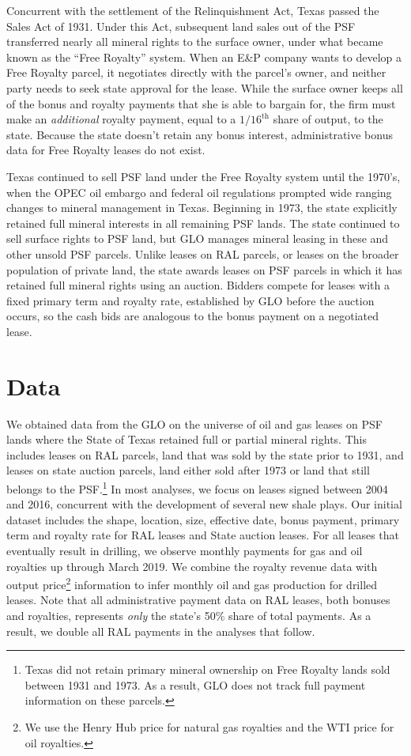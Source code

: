 \documentclass[12pt]{article}
\newcommand{\inputy}[1]{\unskip}
\begin{document}
Concurrent with the settlement of the Relinquishment Act, Texas passed the Sales Act of 1931. Under this Act, subsequent land sales out of the PSF transferred nearly all mineral rights to the surface owner, under what became known as the ``Free Royalty'' system.  When an E\&P company wants to develop a Free Royalty parcel, it negotiates directly with the parcel's owner, and neither party needs to seek state approval for the lease.  While the surface owner keeps all of the bonus and royalty payments that she is able to bargain for, the firm must make an \textit{additional} royalty payment, equal to a $1/16^{\text{th}}$ share of output, to the state.  Because the state doesn't retain any bonus interest, administrative bonus data for Free Royalty leases do not exist. 

Texas continued to sell PSF land under the Free Royalty system until the 1970's, when the OPEC oil embargo and federal oil regulations prompted wide ranging changes to mineral management in Texas. Beginning in 1973, the state explicitly retained full mineral interests in all remaining PSF lands.  The state continued to sell surface rights to PSF land, but GLO manages mineral leasing in these and other unsold PSF parcels. Unlike leases on RAL parcels, or leases on the broader population of private land, the state awards leases on PSF parcels in which it has retained full mineral rights using an auction. Bidders compete for leases with a fixed primary term and royalty rate, established by GLO before the auction occurs, so the cash bids are analogous to the bonus payment on a negotiated lease. 

\section{Data \label{sec:Data}}
We obtained data from the GLO on the universe of oil and gas leases on PSF lands where the State of Texas retained full or partial mineral rights. This includes leases on RAL parcels, land that was sold by the state prior to 1931, and leases on state auction parcels, land either sold after 1973 or land that still belongs to the PSF.\footnote{Texas did not retain primary mineral ownership on Free Royalty lands sold between 1931 and 1973. As a result, GLO does not track full payment information on these parcels.} In most analyses, we focus on leases signed between 2004 and 2016, concurrent with the development of several new shale plays.  Our initial dataset includes the shape, location, size, effective date, bonus payment, primary term and royalty rate for \inputy{../output/estimates/Nsample_RAL_RAW.tex} RAL leases and \inputy{../output/estimates/Nsample_STATE_RAW.tex} State auction leases.  For all leases that eventually result in drilling, we observe monthly payments for gas and oil royalties  up through March 2019.  We combine the royalty revenue data with output price\footnote{We use the Henry Hub price for natural gas royalties and the WTI price for oil royalties.} information to infer monthly oil and gas production for drilled leases. Note that all administrative payment data on RAL leases, both bonuses and royalties, represents \textit{only} the state's 50\% share of total payments.  As a result, we double all RAL payments in the analyses that follow.
\end{document}
